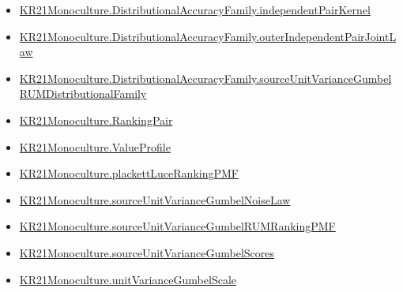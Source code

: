 \documentclass[10pt]{article}
\begin{document}
\begin{itemize}
\item \hyperlink{governing-declaration-6707a8f10749a28d}{KR21\allowbreak{}Monoculture.\allowbreak{}Distributional\allowbreak{}Accuracy\allowbreak{}Family.\allowbreak{}independent\allowbreak{}Pair\allowbreak{}Kernel}
\item \hyperlink{governing-declaration-e6c9a24a5d927c25}{KR21\allowbreak{}Monoculture.\allowbreak{}Distributional\allowbreak{}Accuracy\allowbreak{}Family.\allowbreak{}outer\allowbreak{}Independent\allowbreak{}Pair\allowbreak{}Joint\allowbreak{}Law}
\item \hyperlink{governing-declaration-f3fa3e66c509df42}{KR21\allowbreak{}Monoculture.\allowbreak{}Distributional\allowbreak{}Accuracy\allowbreak{}Family.\allowbreak{}source\allowbreak{}Unit\allowbreak{}Variance\allowbreak{}Gumbel\allowbreak{}RUM\allowbreak{}Distributional\allowbreak{}Family}
\item \hyperlink{governing-declaration-90a7e19d973f51cb}{KR21\allowbreak{}Monoculture.\allowbreak{}Ranking\allowbreak{}Pair}
\item \hyperlink{paper-prerequisite-c0e41e9b0e843969}{KR21\allowbreak{}Monoculture.\allowbreak{}Value\allowbreak{}Profile}
\item \hyperlink{governing-declaration-225190cf7c1bca37}{KR21\allowbreak{}Monoculture.\allowbreak{}plackett\allowbreak{}Luce\allowbreak{}Ranking\allowbreak{}PMF}
\item \hyperlink{governing-declaration-0532077ab681a6e1}{KR21\allowbreak{}Monoculture.\allowbreak{}source\allowbreak{}Unit\allowbreak{}Variance\allowbreak{}Gumbel\allowbreak{}Noise\allowbreak{}Law}
\item \hyperlink{governing-declaration-6119670d89f87afd}{KR21\allowbreak{}Monoculture.\allowbreak{}source\allowbreak{}Unit\allowbreak{}Variance\allowbreak{}Gumbel\allowbreak{}RUM\allowbreak{}Ranking\allowbreak{}PMF}
\item \hyperlink{governing-declaration-b4cb3839ba161191}{KR21\allowbreak{}Monoculture.\allowbreak{}source\allowbreak{}Unit\allowbreak{}Variance\allowbreak{}Gumbel\allowbreak{}Scores}
\item \hyperlink{governing-declaration-1dfb34ee8dd6fc34}{KR21\allowbreak{}Monoculture.\allowbreak{}unit\allowbreak{}Variance\allowbreak{}Gumbel\allowbreak{}Scale}
\end{itemize}
\end{document}

